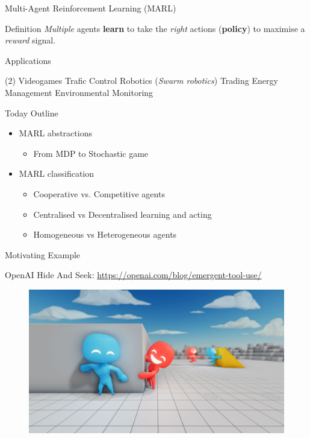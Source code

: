 \documentclass[presentation, 9pt]{beamer}\mode<presentation>{\usetheme{AMSBolognaFC}}
\begin{document}
\begin{frame}[c]{Multi-Agent Reinforcement Learning (MARL)}
	
	\begin{exampleblock}{Definition}
		\emph{Multiple} agents \textbf{learn} to take the \emph{right} actions (\textbf{policy}) to maximise a \emph{reward} signal.
	\end{exampleblock}
	
	\begin{alertblock}{Applications}
		\begin{tasks}(2)
			\task Videogames
			\task Trafic Control
			\task Robotics (\emph{Swarm robotics})
			\task Trading
			\task Energy Management
			\task Environmental Monitoring
		\end{tasks}
	\end{alertblock}
	\begin{exampleblock}{Today Outline}
		\begin{itemize}
			\item MARL abstractions
			\begin{itemize}
				\item[\faArrowRight] From MDP to Stochastic game
			\end{itemize}
			\item MARL classification
			\begin{itemize}
				\item[\faArrowRight] Cooperative vs. Competitive agents
				\item[\faArrowRight] Centralised vs Decentralised learning and acting
				\item[\faArrowRight] Homogeneous vs Heterogeneous agents
			\end{itemize}
		\end{itemize}
	\end{exampleblock}
\end{frame}
\begin{frame}{Motivating Example}
	\centering
	\begin{exampleblock}{OpenAI Hide And Seek: \url{https://openai.com/blog/emergent-tool-use/}}
		\begin{figure}
			\href{https://www.youtube.com/watch?v=kopoLzvh5jY}{\includegraphics[width=\textwidth]{img/open-ai.jpg}}
		\end{figure}
	\end{exampleblock}
\end{frame}
\end{document}
